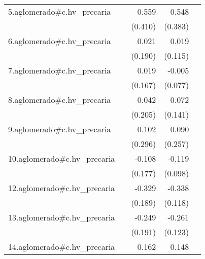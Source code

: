 {\begin{longtable}{l*{4}{D{.}{.}{-1}}}
\addlinespace
5.aglomerado#c.hv\_precaria&                     &       0.559         &       0.548         &                     \\
            &                     &     (0.410)         &     (0.383)         &                     \\
\addlinespace
6.aglomerado#c.hv\_precaria&                     &       0.021         &       0.019         &                     \\
            &                     &     (0.190)         &     (0.115)         &                     \\
\addlinespace
7.aglomerado#c.hv\_precaria&                     &       0.019         &      -0.005         &                     \\
            &                     &     (0.167)         &     (0.077)         &                     \\
\addlinespace
8.aglomerado#c.hv\_precaria&                     &       0.042         &       0.072         &                     \\
            &                     &     (0.205)         &     (0.141)         &                     \\
\addlinespace
9.aglomerado#c.hv\_precaria&                     &       0.102         &       0.090         &                     \\
            &                     &     (0.296)         &     (0.257)         &                     \\
\addlinespace
10.aglomerado#c.hv\_precaria&                     &      -0.108         &      -0.119         &                     \\
            &                     &     (0.177)         &     (0.098)         &                     \\
\addlinespace
12.aglomerado#c.hv\_precaria&                     &      -0.329         &      -0.338\sym{**} &                     \\
            &                     &     (0.189)         &     (0.118)         &                     \\
\addlinespace
13.aglomerado#c.hv\_precaria&                     &      -0.249         &      -0.261\sym{*}  &                     \\
            &                     &     (0.191)         &     (0.123)         &                     \\
\addlinespace
14.aglomerado#c.hv\_precaria&                     &       0.162         &       0.148         &                     \\

\end{longtable}}
